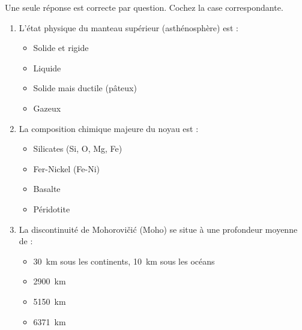 \documentclass[11pt]{article}
\begin{document}
\begin{exercice}
Une seule réponse est correcte par question. Cochez la case correspondante.
\begin{enumerate}
    \item L'état physique du manteau supérieur (asthénosphère) est :
\begin{itemize}
        \item[$\square$] Solide et rigide
        \item[$\square$] Liquide
        \item[$\square$] Solide mais ductile (pâteux)
        \item[$\square$] Gazeux
    \end{itemize}
    \item La composition chimique majeure du noyau est :
\begin{itemize}
        \item[$\square$] Silicates (Si, O, Mg, Fe)
        \item[$\square$] Fer-Nickel (Fe-Ni)
        \item[$\square$] Basalte
        \item[$\square$] Péridotite
    \end{itemize}
    \item La discontinuité de Mohorovičić (Moho) se situe à une profondeur moyenne de :
\begin{itemize}
        \item[$\square$] \SI{30}{\kilo\metre} sous les continents, \SI{10}{\kilo\metre} sous les océans
        \item[$\square$] \SI{2900}{\kilo\metre}
        \item[$\square$] \SI{5150}{\kilo\metre}
        \item[$\square$] \SI{6371}{\kilo\metre}
    \end{itemize}
\end{enumerate}
\end{exercice}
\end{document}
